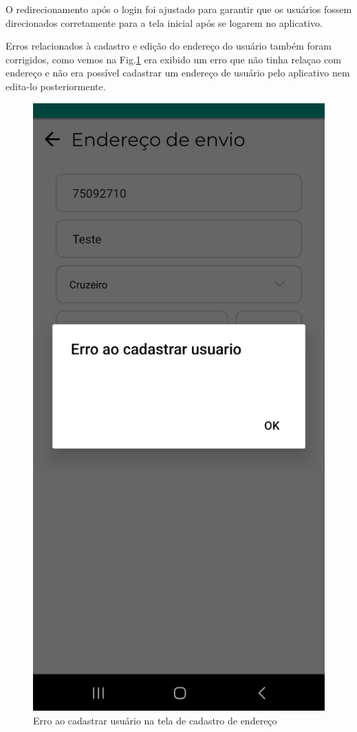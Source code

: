 O redirecionamento após o login foi ajustado para garantir que os usuários fossem direcionados corretamente para a tela inicial após se logarem no aplicativo.

Erros relacionados à cadastro e edição do endereço do usuário também foram corrigidos, como vemos na Fig.\ref{enderecoerro} era exibido um erro que não tinha relaçao com endereço e não era possível cadastrar um endereço de usuário pelo aplicativo nem edita-lo posteriormente.

\begin{figure}[h]
	\centering
	\includegraphics[keepaspectratio=true,scale=0.4]{figuras/enderecoerro.png}
	\caption{Erro ao cadastrar usuário na tela de cadastro de endereço}
	\label{enderecoerro}
\end{figure}

